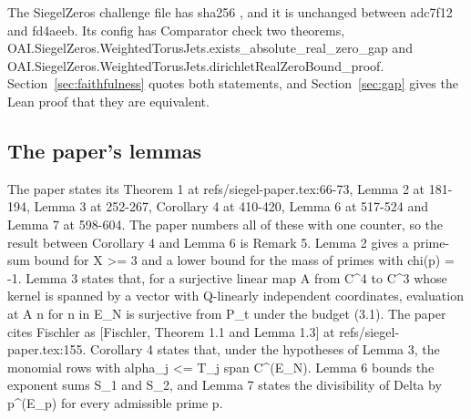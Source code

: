 The SiegelZeros challenge file has sha256 , and it is unchanged between adc7f12 and fd4aeeb. %
Its config has Comparator check two theorems, OAI.SiegelZeros.WeightedTorusJets.exists\_absolute\_real\_zero\_gap and OAI.SiegelZeros.WeightedTorusJets.dirichletRealZeroBound\_proof. %
Section~\ref{sec:faithfulness} quotes both statements, and Section~\ref{sec:gap} gives the Lean proof that they are equivalent. %

\subsection{The paper's lemmas}

The paper \cite{openai-siegel-2026} states its Theorem 1 at refs/siegel-paper.tex:66-73, Lemma 2 at 181-194, Lemma 3 at 252-267, Corollary 4 at 410-420, Lemma 6 at 517-524 and Lemma 7 at 598-604. %
The paper numbers all of these with one counter, so the result between Corollary 4 and Lemma 6 is Remark 5. %
Lemma 2 gives a prime-sum bound for X >= 3 and a lower bound for the mass of primes with chi(p) = -1. %
Lemma 3 states that, for a surjective linear map A from C\textasciicircum4 to C\textasciicircum3 whose kernel is spanned by a vector with Q-linearly independent coordinates, evaluation at A n for n in E\_N is surjective from P\_t under the budget (3.1). %
The paper cites Fischler \cite{fischler2005} as [Fischler, Theorem 1.1 and Lemma 1.3] at refs/siegel-paper.tex:155. %
Corollary 4 states that, under the hypotheses of Lemma 3, the monomial rows with alpha\_j <= T\_j span C\textasciicircum(E\_N). %
Lemma 6 bounds the exponent sums S\_1 and S\_2, and Lemma 7 states the divisibility of Delta by p\textasciicircum(E\_p) for every admissible prime p. %

